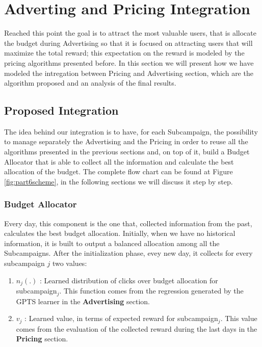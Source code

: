 \chapter{Adverting and Pricing Integration}

Reached this point the goal is to attract the most valuable users, that is allocate the budget during Advertising so that it is focused on attracting users that will maximize the total reward; this expectation on the reward is modeled by the pricing algorithms presented before. In this section we will present how we have modeled the intregation between Pricing and Advertising section, which are the algorithm proposed and an analysis of the final results.

\section{Proposed Integration}
The idea behind our integration is to have, for each Subcampaign, the possibility to manage separately the Advertising and the Pricing in order to reuse all the algorithms presented in the previous sections and, on top of it, build a Budget Allocator that is able to collect all the information and calculate the best allocation of the budget. The complete flow chart can be found at Figure \ref{fig:part6scheme}, in the following sections we will discuss it step by step.

    \subsection{Budget Allocator}
    Every day, this component is the one that, collected information from the past, calculates the best budget allocation. Initially, when we have no historical information, it is built to output a balanced allocation among all the Subcampaigns. After the initialization phase, evey new day, it collects for every subcampaign $ j $ two values:
    
    \begin{enumerate}
        \item $ n_j (.) $ : Learned distribution of clicks over budget allocation for subcampaign$_j$. This function comes from the regression generated by the GPTS learner in the   \textbf{Advertising} section.
        \item $ v_j $ : Learned value, in terms of expected reward for subcampaign$_j$. This value comes from the evaluation of the collected reward during the last days in the \textbf{Pricing} section.
    \end{enumerate} 

